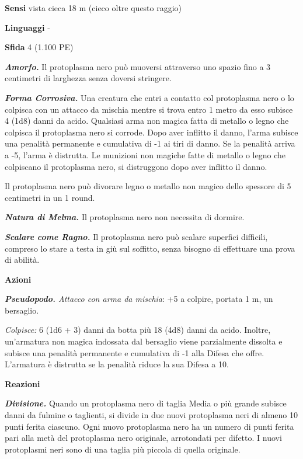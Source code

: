 \begin{multicols}{2}
\textbf{Sensi} vista cieca 18 m (cieco oltre questo raggio)

\textbf{Linguaggi} -

\textbf{Sfida} 4 (1.100 PE)

\emph{\textbf{Amorfo.}} Il protoplasma nero può muoversi attraverso uno spazio fino a 3 centimetri di larghezza senza doversi stringere.

\emph{\textbf{Forma Corrosiva.}} Una creatura che entri a contatto col protoplasma nero o lo colpisca con un attacco da mischia mentre si trova entro 1 metro da esso subisce 4 (1d8) danni da acido. Qualsiasi arma non magica fatta di metallo o legno che colpisca il protoplasma nero si corrode. Dopo aver inflitto il danno, l'arma subisce una penalità permanente e cumulativa di -1 ai tiri di danno. Se la penalità arriva a -5, l'arma è distrutta. Le munizioni non magiche fatte di metallo o legno che colpiscano il protoplasma nero, si distruggono dopo aver inflitto il danno.

Il protoplasma nero può divorare legno o metallo non magico dello spessore di 5 centimetri in un 1 round.

\emph{\textbf{Natura di Melma.}} Il protoplasma nero non necessita di dormire.

\emph{\textbf{Scalare come Ragno.}} Il protoplasma nero può scalare superfici difficili, compreso lo stare a testa in giù sul soffitto, senza bisogno di effettuare una prova di abilità.

\textbf{Azioni}

\emph{\textbf{Pseudopodo.} Attacco con arma da mischia}: +5 a colpire,
portata 1 m, un bersaglio.

\emph{Colpisce:} 6 (1d6 + 3) danni da botta più 18 (4d8) danni da acido. Inoltre, un'armatura non magica indossata dal bersaglio viene parzialmente dissolta e subisce una penalità permanente e cumulativa di -1 alla Difesa che offre. L'armatura è distrutta se la penalità riduce la sua Difesa a 10.

\textbf{Reazioni}

\emph{\textbf{Divisione.}} Quando un protoplasma nero di taglia Media o più grande subisce danni da fulmine o taglienti, si divide in due nuovi protoplasma neri di almeno 10 punti ferita ciascuno. Ogni nuovo protoplasma nero ha un numero di punti ferita pari alla metà del protoplasma nero originale, arrotondati per difetto. I nuovi protoplasmi neri sono di una taglia più piccola di quella originale.


\end{multicols}
